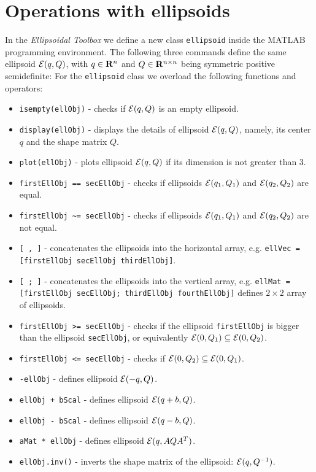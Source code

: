 \section{Operations with ellipsoids}
In the {\it Ellipsoidal Toolbox} we define a new class {\tt ellipsoid} inside
the MATLAB programming environment. The following three commands
define the same ellipsoid $\EE(q,Q)$, with $q\in{\bf R}^n$ and
$Q\in{\bf R}^{n\times n}$ being symmetric positive semidefinite:
For the {\tt ellipsoid} class we overload the following functions and operators:
\begin{itemize}
\item {\tt isempty(ellObj)} - checks if $\EE(q,Q)$ is an empty ellipsoid.
\item {\tt display(ellObj)} - displays the details of ellipsoid $\EE(q,Q)$, namely,
its center $q$ and the shape matrix $Q$.
\item {\tt plot(ellObj)} - plots ellipsoid $\EE(q,Q)$ if its dimension is not greater
than 3.
\item {\tt firstEllObj == secEllObj} - checks if ellipsoids $\EE(q_1,Q_1)$ and
$\EE(q_2,Q_2)$ are equal.
\item {\tt firstEllObj \~{ }= secEllObj} - checks if ellipsoids $\EE(q_1,Q_1)$ and
$\EE(q_2,Q_2)$ are not equal.
\item {\tt [ , ]} - concatenates the ellipsoids into the horizontal array, e.g.
{\tt ellVec = [firstEllObj secEllObj thirdEllObj]}.
\item {\tt [ ; ]} - concatenates the ellipsoids into the vertical array, e.g.
{\tt ellMat = [firstEllObj secEllObj; thirdEllObj fourthEllObj]} defines $2\times 2$ array of ellipsoids.
\item {\tt firstEllObj >= secEllObj} - checks if the ellipsoid {\tt firstEllObj} is bigger than
the ellipsoid {\tt secEllObj}, or equivalently $\EE(0,Q_1)\subseteq\EE(0,Q_2)$.
\item {\tt firstEllObj <= secEllObj} - checks if $\EE(0,Q_2)\subseteq\EE(0,Q_1)$.
\item {\tt -ellObj} - defines ellipsoid $\EE(-q,Q)$.
\item {\tt ellObj + bScal} - defines ellipsoid $\EE(q+b,Q)$.
\item {\tt ellObj - bScal} - defines ellipsoid $\EE(q-b,Q)$.
\item {\tt aMat * ellObj} - defines ellipsoid $\EE(q,AQA^T)$.
\item {\tt ellObj.inv()} - inverts the shape matrix of the ellipsoid: $\EE(q,Q^{-1})$.
\end{itemize}

